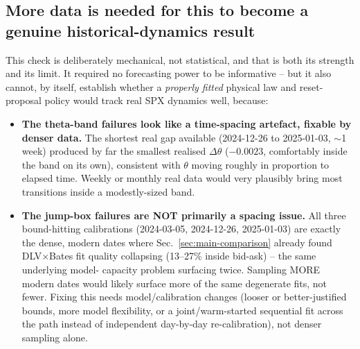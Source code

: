\begin{table}[H]
\centering
\small

\caption{The 5 real chronological transitions: realised move, admissibility
under the standard region, and the forced-admissible mechanism check.}
\label{tab:crc-real-sequence}
\end{table}

\subsection{More data is needed for this to become a genuine historical-dynamics result}
\label{sec:more-data-needed}

This check is deliberately mechanical, not statistical, and that is both
its strength and its limit. It required no forecasting power to be
informative -- but it also cannot, by itself, establish whether a
\emph{properly fitted} physical law and reset-proposal policy would track
real SPX dynamics well, because:

\begin{itemize}
\item \textbf{The theta-band failures look like a time-spacing artefact,
  fixable by denser data.} The shortest real gap available (2024-12-26 to
  2025-01-03, $\sim$1 week) produced by far the smallest realised
  $\Delta\theta$ ($-0.0023$, comfortably inside the band on its own),
  consistent with $\theta$ moving roughly in proportion to elapsed time.
  Weekly or monthly real data would very plausibly bring most transitions
  inside a modestly-sized band.
\item \textbf{The jump-box failures are NOT primarily a spacing issue.}
  All three bound-hitting calibrations (2024-03-05, 2024-12-26,
  2025-01-03) are exactly the dense, modern dates where
  Sec.~\ref{sec:main-comparison} already found DLV$\times$Bates fit quality
  collapsing (13--27\% inside bid-ask) -- the same underlying model-
  capacity problem surfacing twice. Sampling MORE modern dates would
  likely surface more of the same degenerate fits, not fewer. Fixing this
  needs model/calibration changes (looser or better-justified bounds, more
  model flexibility, or a joint/warm-started sequential fit across the
  path instead of independent day-by-day re-calibration), not denser
  sampling alone.
\end{itemize}

